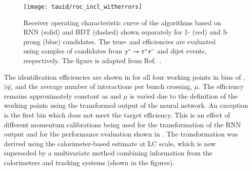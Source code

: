 \begin{figure}[htbp]
  \centering

  \texttt{[image: tauid/roc\_incl\_witherrors]}

  \caption[Receiver operating characteristic curve of the \tauid algorithms
  based on RNN and BDT.]{Receiver operating characteristic curve of the \tauid
    algorithms based on RNN (solid) and BDT (dashed) shown separately for 1-
    (red) and 3-prong (blue) candidates. The true- and \faketauhadvis
    efficiencies are evaluated using samples of \tauhadvis candidates from
    $\gamma^{*} \to \tau^{+} \tau^{-}$ and dijet events, respectively.  The figure is
    adapted from Ref.~\cite{ATL-PHYS-PUB-2019-033}.}%
  \label{fig:tauid_rnn_bdt_roc_comparison}
\end{figure}

The \tauhadvis identification efficiencies
are shown in  for all four working points in bins of
\tauhadvis \pT, \tauhadvis $|\eta|$, and the average number of interactions per
bunch crossing, $\mu$. The efficiency remains approximately constant as
\tauhadvis \pT and $\mu$ is varied due to the definition of the working points
using the transformed output of the neural network. An exception is the first
\tauhadvis \pT bin which does not meet the target efficiency. This is an effect
of different \tauhadvis momentum calibrations being used for the transformation
of the RNN output and for the performance evaluation shown in
. The transformation was
derived using the calorimeter-based \tauhadvis \pT estimate at LC scale, which
is now superseded by a multivariate method combining information from the
calorimeters and tracking systems (shown in the figures).

